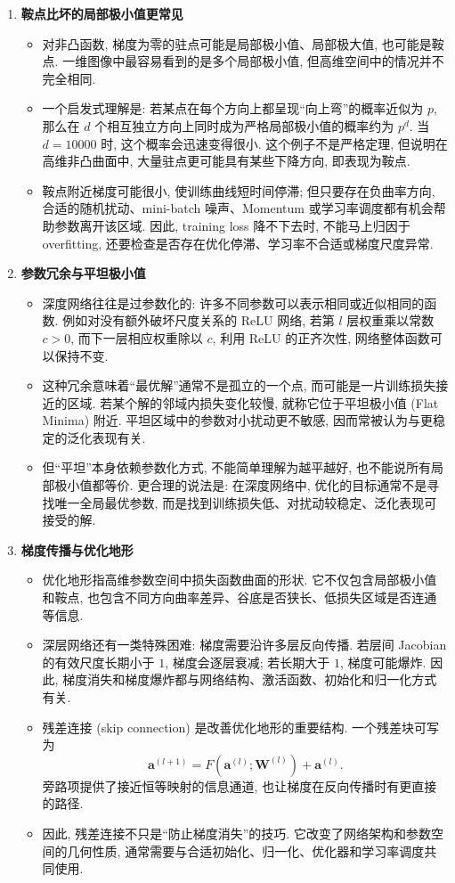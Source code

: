 \documentclass{../nndlcourse}
\begin{document}
\begin{enumerate}
\begin{itemize}
    \end{itemize}
  \item \textbf{鞍点比坏的局部极小值更常见}
    \begin{itemize}
      \item 对非凸函数, 梯度为零的驻点可能是局部极小值、局部极大值, 也可能是鞍点. 一维图像中最容易看到的是多个局部极小值, 但高维空间中的情况并不完全相同.
      \item 一个启发式理解是: 若某点在每个方向上都呈现“向上弯”的概率近似为 $p$, 那么在 $d$ 个相互独立方向上同时成为严格局部极小值的概率约为 $p^d$. 当 $d=10000$ 时, 这个概率会迅速变得很小. 这个例子不是严格定理, 但说明在高维非凸曲面中, 大量驻点更可能具有某些下降方向, 即表现为鞍点.
      \item 鞍点附近梯度可能很小, 使训练曲线短时间停滞; 但只要存在负曲率方向, 合适的随机扰动、mini-batch 噪声、Momentum 或学习率调度都有机会帮助参数离开该区域. 因此, training loss 降不下去时, 不能马上归因于 overfitting, 还要检查是否存在优化停滞、学习率不合适或梯度尺度异常.
    \end{itemize}
  \item \textbf{参数冗余与平坦极小值}
    \begin{itemize}
      \item 深度网络往往是过参数化的: 许多不同参数可以表示相同或近似相同的函数. 例如对没有额外破坏尺度关系的 ReLU 网络, 若第 $l$ 层权重乘以常数 $c>0$, 而下一层相应权重除以 $c$, 利用 ReLU 的正齐次性, 网络整体函数可以保持不变.
      \item 这种冗余意味着“最优解”通常不是孤立的一个点, 而可能是一片训练损失接近的区域. 若某个解的邻域内损失变化较慢, 就称它位于平坦极小值 (Flat Minima) 附近. 平坦区域中的参数对小扰动更不敏感, 因而常被认为与更稳定的泛化表现有关.
      \item 但“平坦”本身依赖参数化方式, 不能简单理解为越平越好, 也不能说所有局部极小值都等价. 更合理的说法是: 在深度网络中, 优化的目标通常不是寻找唯一全局最优参数, 而是找到训练损失低、对扰动较稳定、泛化表现可接受的解.
    \end{itemize}
  \item \textbf{梯度传播与优化地形}
    \begin{itemize}
      \item 优化地形指高维参数空间中损失函数曲面的形状. 它不仅包含局部极小值和鞍点, 也包含不同方向曲率差异、谷底是否狭长、低损失区域是否连通等信息.
      \item 深层网络还有一类特殊困难: 梯度需要沿许多层反向传播. 若层间 Jacobian 的有效尺度长期小于 $1$, 梯度会逐层衰减; 若长期大于 $1$, 梯度可能爆炸. 因此, 梯度消失和梯度爆炸都与网络结构、激活函数、初始化和归一化方式有关.
      \item 残差连接 (skip connection) 是改善优化地形的重要结构. 一个残差块可写为
      \[
        \boldsymbol{a}^{(l+1)}
        =
        F(\boldsymbol{a}^{(l)};\boldsymbol{W}^{(l)})
        +
        \boldsymbol{a}^{(l)}.
      \]
      旁路项提供了接近恒等映射的信息通道, 也让梯度在反向传播时有更直接的路径.
      \item 因此, 残差连接不只是“防止梯度消失”的技巧. 它改变了网络架构和参数空间的几何性质, 通常需要与合适初始化、归一化、优化器和学习率调度共同使用.
    \end{itemize}
\end{enumerate}
\end{document}
